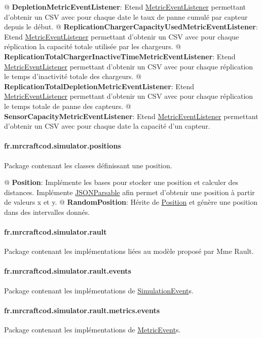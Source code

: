 \documentclass[final]{polytech/polytech}
\newcommand{\class}[1]{\textbf{#1}\label{class:#1}}
\newcommand{\klass}[1]{\hyperref[class:#1]{#1}}
\begin{document}
				\begin{easylist}
					@ \class{DepletionMetricEventListener}: Etend \klass{MetricEventListener} permettant d'obtenir un CSV avec pour chaque date le taux de panne cumulé par capteur depuis le début.
					@ \class{ReplicationChargerCapacityUsedMetricEventListener}: Etend \klass{MetricEventListener} permettant d'obtenir un CSV avec pour chaque réplication la capacité totale utilisée par les chargeurs.
					@ \class{ReplicationTotalChargerInactiveTimeMetricEventListener}: Etend \klass{MetricEventListener} permettant d'obtenir un CSV avec pour chaque réplication le temps d'inactivité totale des chargeurs.
					@ \class{ReplicationTotalDepletionMetricEventListener}: Etend \klass{MetricEventListener} permettant d'obtenir un CSV avec pour chaque réplication le temps totale de panne des capteurs.
					@ \class{SensorCapacityMetricEventListener}: Etend \klass{MetricEventListener} permettant d'obtenir un CSV avec pour chaque date la capacité d'un capteur.
				\end{easylist}
				
			\paragraph{fr.mrcraftcod.simulator.positions}
				Package contenant les classes définissant une position.
				
				\begin{easylist}
					@ \class{Position}: Implémente les bases pour stocker une position et calculer des distances. Implémente \klass{JSONParsable} afin permet d'obtenir une position à partir de valeurs x et y.
					@ \class{RandomPosition}: Hérite de \klass{Position} et génère une position dans des intervalles donnés.
				\end{easylist}
				
			\paragraph{fr.mrcraftcod.simulator.rault}
				Package contenant les implémentations liées au modèle proposé par Mme Rault.
				
			\paragraph{fr.mrcraftcod.simulator.rault.events}
				Package contenant les implémentations de \klass{SimulationEvent}s. 
				
			\paragraph{fr.mrcraftcod.simulator.rault.metrics.events}
				Package contenant les implémentations de \klass{MetricEvent}s. 
				
\end{document}
